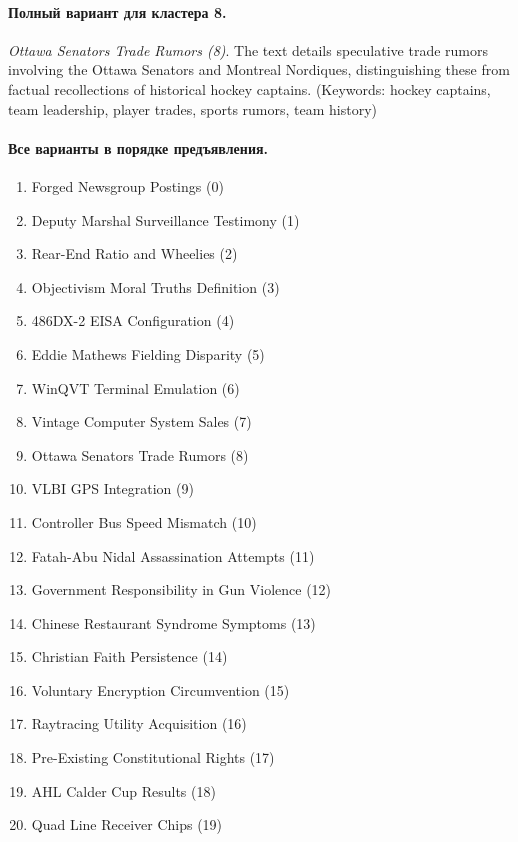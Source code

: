 \paragraph{Полный вариант для кластера 8.} \textit{Ottawa Senators Trade Rumors (8)}. The text details speculative trade rumors involving the Ottawa Senators and Montreal Nordiques, distinguishing these from factual recollections of historical hockey captains. (Keywords: hockey captains, team leadership, player trades, sports rumors, team history)
\paragraph{Все варианты в порядке предъявления.}
\begin{enumerate}
\item Forged Newsgroup Postings (0)
\item Deputy Marshal Surveillance Testimony (1)
\item Rear-End Ratio and Wheelies (2)
\item Objectivism Moral Truths Definition (3)
\item 486DX-2 EISA Configuration (4)
\item Eddie Mathews Fielding Disparity (5)
\item WinQVT Terminal Emulation (6)
\item Vintage Computer System Sales (7)
\item Ottawa Senators Trade Rumors (8)
\item VLBI GPS Integration (9)
\item Controller Bus Speed Mismatch (10)
\item Fatah-Abu Nidal Assassination Attempts (11)
\item Government Responsibility in Gun Violence (12)
\item Chinese Restaurant Syndrome Symptoms (13)
\item Christian Faith Persistence (14)
\item Voluntary Encryption Circumvention (15)
\item Raytracing Utility Acquisition (16)
\item Pre-Existing Constitutional Rights (17)
\item AHL Calder Cup Results (18)
\item Quad Line Receiver Chips (19)
\end{enumerate}
